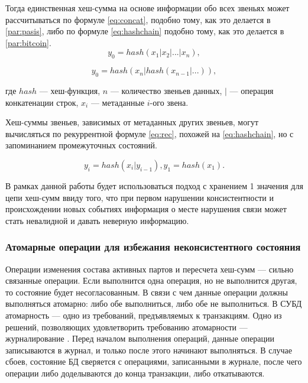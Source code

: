 Тогда единственная хеш-сумма на основе информации обо всех звеньях может рассчитываться по формуле \ref{eq:concat}, подобно тому, как это делается в \ref{par:pasis}, либо по формуле \ref{eq:hashchain} подобно тому, как это делается в \ref{par:bitcoin}.
\begin{equation}
\label{eq:concat}
y_0 = hash(x_1 | x_2 | ... | x_n),
\end{equation}

\begin{equation}
\label{eq:hashchain}
y_0 = hash(x_n | hash(x_{n-1} | ...)),
\end{equation}

где $hash$ --- хеш-функция, $n$ --- количество звеньев данных, $|$ --- операция конкатенации строк, $x_i$ --- метаданные $i$-ого звена.

Хеш-суммы звеньев, зависимых от метаданных других звеньев, могут вычисляться по рекуррентной формуле \ref{eq:rec}, похожей на \ref{eq:hashchain}, но с запоминанием промежуточных состояний.

\begin{equation}
\label{eq:rec}
y_i = hash(x_i|y_{i-1}), y_1 = hash(x_1).
\end{equation}

В рамках данной работы будет использоваться подход с хранением 1 значения для цепи хеш-сумм ввиду того, что при первом нарушении консистентности и происхождении новых событиях информация о месте нарушения связи может стать невалидной и давать неверную информацию.

\subsubsection{Атомарные операции для избежания неконсистентного состояния}

Операции изменения состава активных партов и пересчета хеш-сумм --- сильно связанные операции. Если выполнится одна операция, но не выполнится другая, то состояние будет несогласованным. В связи с чем данные операции должны выполняться атомарно: либо обе выполниться, либо обе не выполниться. В СУБД атомарность \cite{atomicity} --- одно из требований, предъявляемых к транзакциям. Одно из решений, позволяющих удовлетворить требованию атомарности --- журналирование \cite{journaldbms}. Перед началом выполнения операций, данные операции записываются в журнал, и только после этого начинают выполняться. В случае сбоев, состояние БД сверяется с операциями, записанными в журнале, после чего операции либо доделываются до конца транзакции, либо откатываются.

